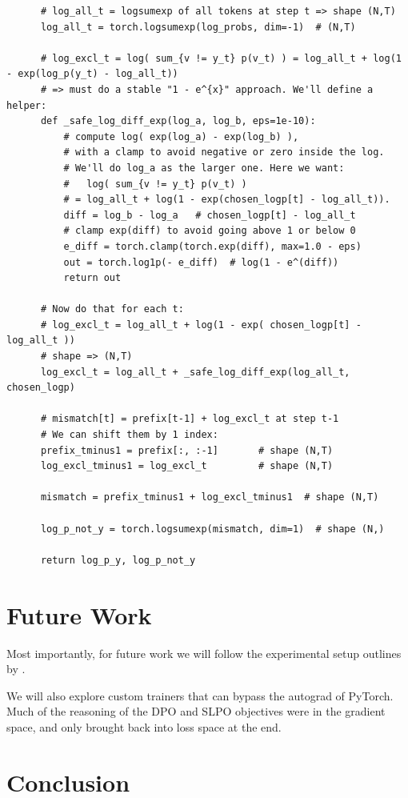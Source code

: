 \documentclass[twoside,11pt]{article}
\begin{document}
\begin{verbatim}
      # log_all_t = logsumexp of all tokens at step t => shape (N,T)
      log_all_t = torch.logsumexp(log_probs, dim=-1)  # (N,T)
  
      # log_excl_t = log( sum_{v != y_t} p(v_t) ) = log_all_t + log(1 - exp(log_p(y_t) - log_all_t))
      # => must do a stable "1 - e^{x}" approach. We'll define a helper:
      def _safe_log_diff_exp(log_a, log_b, eps=1e-10):
          # compute log( exp(log_a) - exp(log_b) ), 
          # with a clamp to avoid negative or zero inside the log.
          # We'll do log_a as the larger one. Here we want:
          #   log( sum_{v != y_t} p(v_t) ) 
          # = log_all_t + log(1 - exp(chosen_logp[t] - log_all_t)).
          diff = log_b - log_a   # chosen_logp[t] - log_all_t
          # clamp exp(diff) to avoid going above 1 or below 0
          e_diff = torch.clamp(torch.exp(diff), max=1.0 - eps)
          out = torch.log1p(- e_diff)  # log(1 - e^(diff))
          return out
  
      # Now do that for each t:
      # log_excl_t = log_all_t + log(1 - exp( chosen_logp[t] - log_all_t ))
      # shape => (N,T)
      log_excl_t = log_all_t + _safe_log_diff_exp(log_all_t, chosen_logp)
  
      # mismatch[t] = prefix[t-1] + log_excl_t at step t-1
      # We can shift them by 1 index:
      prefix_tminus1 = prefix[:, :-1]       # shape (N,T)
      log_excl_tminus1 = log_excl_t         # shape (N,T)
  
      mismatch = prefix_tminus1 + log_excl_tminus1  # shape (N,T)
  
      log_p_not_y = torch.logsumexp(mismatch, dim=1)  # shape (N,)
  
      return log_p_y, log_p_not_y      
\end{verbatim}

\section{Future Work}

Most importantly, for future work we will follow the
experimental setup outlines by \cite{Rafailov}.

We will also explore custom trainers that can bypass the autograd
of PyTorch. Much of the reasoning of the DPO and SLPO objectives
were in the gradient space, and only brought back into loss
space at the end. 

\section{Conclusion}
\end{document}
